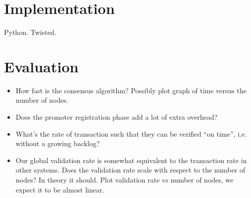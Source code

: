 \section{Implementation}
Python. Twisted.

\section{Evaluation}
\begin{itemize}
  \item How fast is the consensus algorithm? Possibly plot graph of time versus
    the number of nodes.
  \item Does the promoter registration phase add a lot of extra overhead?
  \item What's the rate of transaction such that they can be verified ``on
    time'', i.e. without a growing backlog?
  \item Our global validation rate is somewhat equivalent to the transaction
    rate in other systems. Does the validation rate scale with respect to the
    number of nodes? In theory it should. Plot validation rate vs number of
    nodes, we expect it to be almost linear.
\end{itemize}